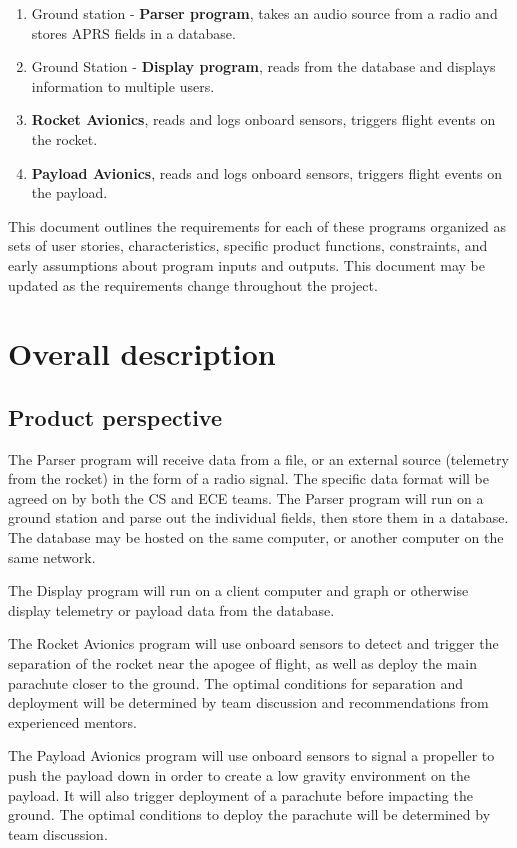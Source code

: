 \documentclass[onecolumn, draftclsnofoot, 10pt, compsoc]{IEEEtran}
\begin{document}
\begin{enumerate}
\item Ground station - \textbf{Parser program}, takes an audio source from a radio and stores APRS fields in a database.
\item Ground Station - \textbf{Display program}, reads from the database and displays information to multiple users.
\item \textbf{Rocket Avionics}, reads and logs onboard sensors, triggers flight events on the rocket.
\item \textbf{Payload Avionics}, reads and logs onboard sensors, triggers flight events on the payload.
\end{enumerate}

This document outlines the requirements for each of these programs organized as sets of user stories, characteristics, specific product functions, constraints, and early assumptions about program inputs and outputs. This document may be updated as the requirements change throughout the project.

\section{Overall description}
\subsection{Product perspective}
The Parser program will receive data from a file, or an external source (telemetry from the rocket) in the form of a radio signal. The specific data format will be agreed on by both the CS and ECE teams.  The Parser program will run on a ground station and parse out the individual fields, then store them in a database. The database may be hosted on the same computer, or another computer on the same network.

The Display program will run on a client computer and graph or otherwise display telemetry or payload data from the database.

The Rocket Avionics program will use onboard sensors to detect and trigger the separation of the rocket near the apogee of flight, as well as deploy the main parachute closer to the ground.  The optimal conditions for separation and deployment will be determined by team discussion and recommendations from experienced mentors.

The Payload Avionics program will use onboard sensors to signal a propeller to push the payload down in order to create a low gravity environment on the payload. It will also trigger deployment of a parachute before impacting the ground.  The optimal conditions to deploy the parachute will be determined by team discussion.
\end{document}
